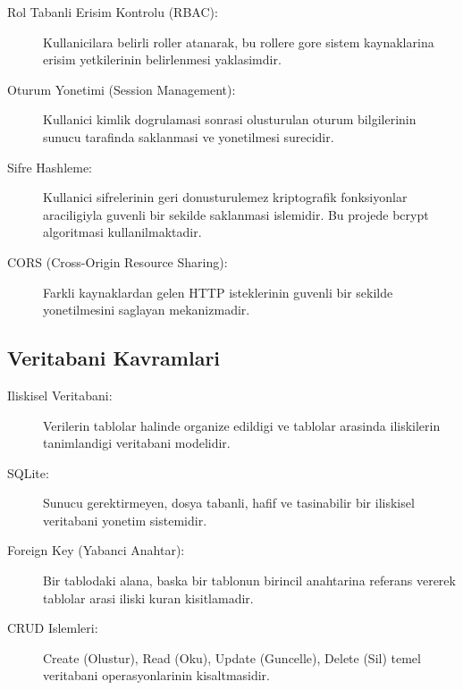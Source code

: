 \begin{description}
    \item[Rol Tabanli Erisim Kontrolu (RBAC):] Kullanicilara belirli 
    roller atanarak, bu rollere gore sistem kaynaklarina erisim 
    yetkilerinin belirlenmesi yaklasimdir.
    
    \item[Oturum Yonetimi (Session Management):] Kullanici 
    kimlik dogrulamasi sonrasi olusturulan oturum bilgilerinin 
    sunucu tarafinda saklanmasi ve yonetilmesi surecidir.
    
    \item[Sifre Hashleme:] Kullanici sifrelerinin geri donusturulemez 
    kriptografik fonksiyonlar araciligiyla guvenli bir sekilde 
    saklanmasi islemidir. Bu projede bcrypt algoritmasi 
    kullanilmaktadir.
    
    \item[CORS (Cross-Origin Resource Sharing):] Farkli kaynaklardan 
    gelen HTTP isteklerinin guvenli bir sekilde yonetilmesini 
    saglayan mekanizmadir.
\end{description}

\subsection{Veritabani Kavramlari}
\label{subsec:veritabani-kavramlari}

\begin{description}
    \item[Iliskisel Veritabani:] Verilerin tablolar halinde organize 
    edildigi ve tablolar arasinda iliskilerin tanimlandigi 
    veritabani modelidir.
    
    \item[SQLite:] Sunucu gerektirmeyen, dosya tabanli, hafif ve 
    tasinabilir bir iliskisel veritabani yonetim sistemidir.
    
    \item[Foreign Key (Yabanci Anahtar):] Bir tablodaki alana, 
    baska bir tablonun birincil anahtarina referans vererek 
    tablolar arasi iliski kuran kisitlamadir.
    
    \item[CRUD Islemleri:] Create (Olustur), Read (Oku), Update 
    (Guncelle), Delete (Sil) temel veritabani operasyonlarinin 
    kisaltmasidir.
\end{description}

